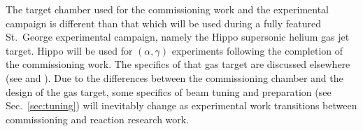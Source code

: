 The target chamber used for the commissioning work and the experimental
campaign is different than that which will be used during a fully
featured St.\ George experimental campaign, namely the Hippo supersonic
helium gas jet target. Hippo will be used for $(\alpha,\gamma)$
experiments following the completion of the commissioning work. The
specifics of that gas target are discussed elsewhere (see
\cite{Kontos2012} and \cite{Meisel2016}). Due to the differences between
the commissioning chamber and the design of the gas target, some
specifics of beam tuning and preparation (see Sec.~\ref{sec:tuning})
will inevitably change as experimental work transitions between
commissioning and reaction research work.
